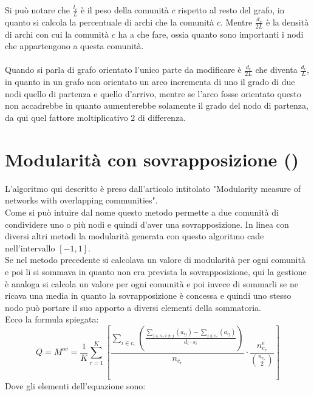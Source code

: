 %
Si può notare che $\displaystyle\frac{l_c}{L}$ è il peso della comunità $c$ rispetto al resto del grafo, in quanto si calcola la percentuale di archi che la comunità $c$. Mentre $\displaystyle\frac{d_c}{2L}$ è la densità di archi con cui la comunità $c$ ha a che fare, ossia quanto sono importanti i nodi che appartengono a questa comunità.\\
\\
Quando si parla di grafo orientato l'unico parte da modificare è $\displaystyle\frac{d_c}{2L}$ che diventa $\displaystyle\frac{d_c}{L}$, in quanto in un grafo non orientato un arco incrementa di uno il grado di due nodi quello  di partenza e quello d'arrivo, mentre se l'arco fosse orientato questo non accadrebbe in quanto aumenterebbe solamente il grado del nodo di partenza, da qui quel fattore moltiplicativo $2$ di differenza.
%
%
\section{Modularità con sovrapposizione (\mover)}
L'algoritmo qui descritto è preso dall'articolo intitolato "Modularity measure of networks with overlapping communities".\\
Come si può intuire dal nome questo metodo permette a due comunità di condividere uno o più nodi e quindi d'aver una sovrapposizione. In linea con diversi altri metodi la modularità generata con questo algoritmo cade nell'intervallo $[-1, 1]$.\\
Se nel metodo precedente si calcolava un valore di modularità per ogni comunità e poi li si sommava in quanto non era prevista la sovrapposizione, qui la gestione è analoga si calcola un valore per ogni comunità e poi invece di sommarli se ne ricava una media in quanto la sovrapposizione è concessa e quindi uno stesso nodo può portare il suo apporto a diversi elementi della sommatoria.\\
Ecco la formula spiegata:
\begin{equation}
	Q = M^{ov} = \frac{1}{K} 
	\sum_{r=1}^{K} \left[
		\frac
			{\sum\limits_{i \in c_r} 
				\left( \frac
					{
						\sum\limits_{j \in c_r, i \neq j} \left( a_{ij} \right) 
						- 
						\sum\limits_{j \notin c_r} \left( a_{ij} \right) 
					} 
					{d_i \cdot s_i} 
				\right) } 
			{n_{c_r}}
		\cdot
		\frac{ n^e_{c_r} }{ \binom{n_{c_r}}{2} } 
	\right]
	\label{eq:m_over}
\end{equation}
Dove gli elementi dell'equazione sono:
